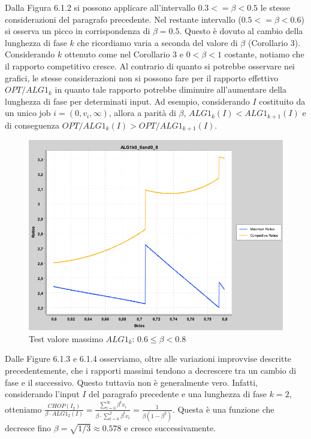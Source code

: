\documentclass[twoside,openany,titlepage,fleqn,
	headinclude,12pt,a4paper,BCOR5mm,footinclude]{scrbook}
\begin{document}
Dalla Figura 6.1.2 si possono applicare all'intervallo $0.3 <= \beta < 0.5$ le stesse considerazioni del paragrafo precedente. Nel restante intervallo ($0.5 <= \beta < 0.6$) si osserva un picco in corrispondenza di $\beta = 0.5$. Questo è dovuto al cambio della lunghezza di fase $k$ che ricordiamo varia a seconda del valore di $\beta$ (Corollario 3). Considerando $k$ ottenuto come nel Corollario 3 e $0 <\beta < 1$ costante, notiamo che il rapporto competitivo cresce. Al contrario di quanto si potrebbe osservare nei grafici, le stesse considerazioni non si possono fare per il rapporto effettivo $OPT/ALG1_{k}$ in quanto tale rapporto potrebbe diminuire all'aumentare della lunghezza di fase per determinati input. Ad esempio, considerando $I$ costituito da un unico job $i = (0, v_{i},\infty)$, allora a parità di $\beta$, $ALG1_{k}(I) < ALG1_{k+1}(I)$ e di conseguenza $OPT/ALG1_{k}(I) > OPT/ALG1_{k+1}(I)$.
\begin{figure}[H]
\caption{Test valore massimo $ALG1_{k}$: $0.6 \leq \beta < 0.8$}
\centering
\includegraphics[scale=0.4]{max/ALG1k0_6and0_8.png}
\end{figure}
Dalle Figure 6.1.3 e 6.1.4 osserviamo, oltre alle variazioni improvvise descritte precedentemente, che i rapporti massimi tendono a decrescere tra un cambio di fase e il successivo. Questo tuttavia non è generalmente vero. Infatti, considerando l'input $I$ del paragrafo precedente e una lunghezza di fase $k = 2$, otteniamo $\frac{CHOP(I_{2})}{\beta \cdot ALG1_{2}(I)} = \frac{\sum_{t = 0}^{\infty}\beta^{t}v_{i}}{\beta \cdot \sum_{t = 0}^{2}\beta^{t} v_{i}} = \frac{1}{\beta(1 - \beta^{2})}$. Questa è una funzione che decresce fino $\beta = \sqrt{1/3} \approx 0.578$ e cresce successivamente.
\end{document}
